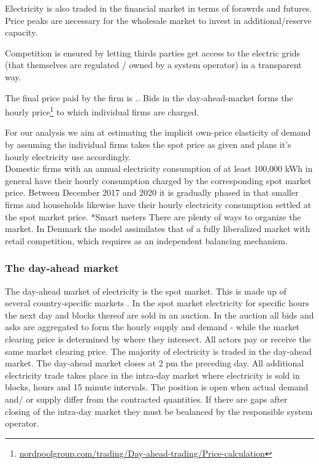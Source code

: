 Electricity is also traded in the financial market in terms of forawrds and futures. Price peaks are necessary for the wholesale market to invest in additional/reserve capacity. 

Competition is ensured by letting thirds parties get access to the electric grids (that themselves are regulated / owned by a system operator) in a transparent way. 

The final price paid by the firm is .. 
Bids in the day-ahead-market forms the hourly price\footnote{\url{nordpoolgroup.com/trading/Day-ahead-trading/Price-calculation}} to which individual firms are charged. 

For our analysis we aim at estimating the implicit own-price elasticity of demand by assuming the individual firms takes the spot price as given and plans it's hourly electricity use accordingly.
\medskip\\
Domestic firms with an annual electricity consumption of at least 100,000 kWh in general have their hourly consumption charged by the corresponding spot market price. Between December 2017 and 2020 it is gradually phased in that
smaller firms and households likewise have their hourly electricity consumption settled at the spot market price.
*Smart meters
There are plenty of ways to organize the market. In Denmark the model assimilates that of a fully liberalized market with retail competition, which requires as an independent balancing mechanism. 

\subsubsection{The day-ahead market}
The day-ahead market of electricity is the spot market. This is made up of several country-specific markets . In the spot market electricity for specific hours the next day and blocks thereof are sold in an auction. In the auction all bids and asks are aggregated to form the hourly supply and demand - while the market clearing price is determined by where they intersect. All actors pay or receive the same market clearing price. The majority of electricity is traded in the day-ahead market. %
The day-ahead market closes at 2 pm the preceding day. All additional electricity trade takes place in the intra-day market where electricity is sold in blocks, hours and 15 minute intervals. The position is open when actual demand and/ or supply differ from the contracted quantities. If there are gaps after closing of the intra-day market they must be bealanced by the responsible system operator.  



